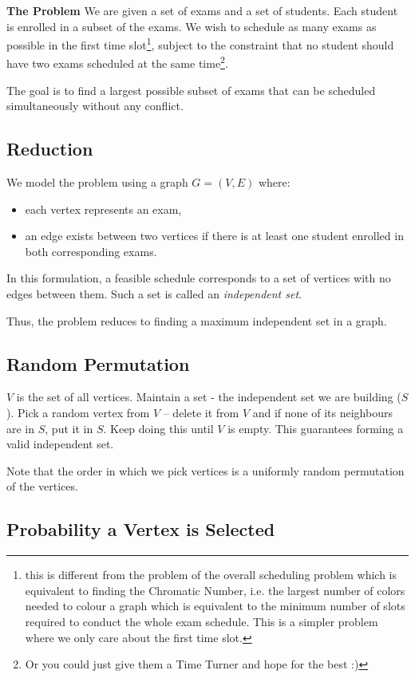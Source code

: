 \documentclass[11pt,openany]{book}
\begin{document}
\textbf{The Problem}
We are given a set of exams and a set of students. Each student is enrolled in a subset of the exams. 
We wish to schedule as many exams as possible in the first time slot\footnote{this is different
from the problem of the overall scheduling problem which is equivalent to finding the Chromatic Number, 
i.e. the largest number of colors needed to colour a graph which is equivalent to the minimum number 
of slots required to conduct the whole exam schedule. 
This is a simpler problem where we only care about the first time slot.}, 
subject to the constraint that no student should have two exams scheduled at the 
same time\footnote{Or you could just give them a Time Turner and hope for the best :)}.

The goal is to find a largest possible subset of exams that can be scheduled simultaneously without any conflict.

\subsection*{Reduction}

We model the problem using a graph \(G=(V,E)\) where:
\begin{itemize}
    \item each vertex represents an exam,
    \item an edge exists between two vertices if there is at least one student enrolled in both corresponding exams.
\end{itemize}

In this formulation, a feasible schedule corresponds to a set of vertices with no edges between them. Such a set is called an \emph{independent set}.

Thus, the problem reduces to finding a maximum independent set in a graph.

\subsection{Random Permutation}

$V$ is the set of all vertices.
Maintain a set - the independent set we are building ($S$).
Pick a random vertex from $V$ -- delete it from $V$ and if none of its neighbours are in $S$, put it in $S$.
Keep doing this until $V$ is empty. This guarantees forming a valid independent set.

Note that the order in which we pick vertices is a uniformly random permutation of the vertices.

\subsection*{Probability a Vertex is Selected}
\end{document}
